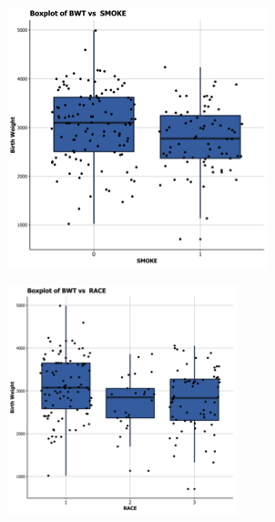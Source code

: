\vspace{0.5cm}
\begin{figure}[!htb]
        \centering
        \begin{subfigure}[b]{0.3\textwidth}
            \centering
            \includegraphics[width=\textwidth]{Images/BWTvsSMOKE.png}
            \label{fig:BWTvsSMOKE}
        \end{subfigure}
        \quad
        \begin{subfigure}[b]{0.3\textwidth}  
            \centering 
            \includegraphics[width=\textwidth]{Images/BWTvsRACE.png}
            \label{fig:BWTvsRACE}
        \end{subfigure}
        

\end{figure}
